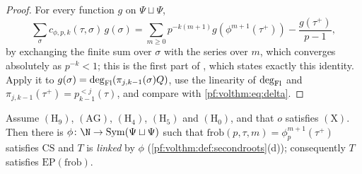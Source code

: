 \begin{proof}
For every function $g$ on $\Psi\sqcup\Psi$,
\[
\sum_\sigma c_{\phi,p,k}(\tau,\sigma)\,g(\sigma)=\sum_{m\ge0}p^{-k(m+1)}g(\phi^{m+1}(\tau^+))-\frac{g(\tau^+)}{p-1},
\]
by exchanging the finite sum over $\sigma$ with the series over $m$, which converges absolutely as $p^{-k}<1$; this
is the first part of , which states exactly this
identity. Apply it to $g(\sigma)=\deg_{\mathrm{Fl}}(\pi_{j,k-1}(\sigma)Q)$, use the linearity of $\deg_{\mathrm{Fl}}$ and
$\pi_{j,k-1}(\tau^+)=p^{<j}_{k-1}(\tau)$, and compare with \eqref{pf:volthm:eq:delta}.
\end{proof}

\begin{proposition}\label{pf:volthm:prop:prop6}
Assume $(\mathrm{H}_9)$, $(\mathrm{AG})$, $(\mathrm{H}_4)$, $(\mathrm{H}_5)$ and
$(\mathrm{H}_0)$, and that $o$ satisfies $(\mathrm{X})$. Then there is $\phi\colon\N\to\mathrm{Sym}(\Psi\sqcup\Psi)$
such that $\mathrm{frob}(p,\tau,m)=\phi_p^{m+1}(\tau^+)$ satisfies $\mathrm{CS}$ and $T$ is \emph{linked} by $\phi$
(\cref{pf:volthm:def:secondroots}(d)); consequently $T$ satisfies $\mathrm{EP}(\mathrm{frob})$.
\end{proposition}

